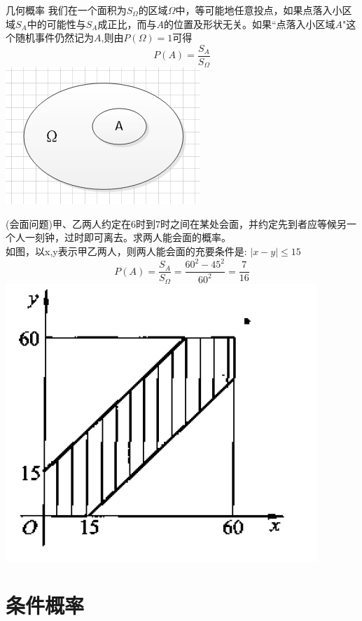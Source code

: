 \documentclass[xcolor=svgnames,serif,table,10pt]{beamer}
\begin{document}
\begin{frame}{几何概率}
我们在一个面积为$S_\Omega$的区域$\Omega$中，等可能地任意投点，如果点落入小区域$S_A$中的可能性与$S_A$成正比，而与$A$的位置及形状无关。如果``点落入小区域$A$"这个随机事件仍然记为$A$,则由$P(\Omega)=1$可得
$$P(A)=\frac{S_A}{S_\Omega}$$
\includegraphics[scale=0.4]{geometry}
\end{frame}

\begin{frame}
\begin{example}
	(会面问题)甲、乙两人约定在6时到7时之间在某处会面，并约定先到者应等候另一个人一刻钟，过时即可离去。求两人能会面的概率。\\
	如图，以x,y表示甲乙两人，则两人能会面的充要条件是: $|x-y|\leq 15$\\
	$$P(A)=\frac{S_A}{S_\Omega}=\frac{60^2-45^2}{60^2}=\frac{7}{16}$$
	\includegraphics[scale=0.4]{geometry1}
\end{example}
\end{frame}

\section{条件概率}
\end{document}
